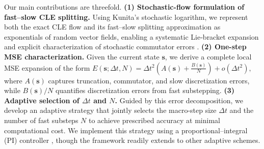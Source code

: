 \documentclass{article}
\begin{document}
Our main contributions are threefold.
\textbf{(1) Stochastic-flow formulation of fast--slow CLE splitting.}  
Using Kunita’s stochastic logarithm, we represent both the exact CLE flow and
its fast--slow splitting approximation as exponentials of random vector fields, enabling a systematic Lie‑bracket expansion and explicit characterization of stochastic commutator errors \cite{kunita1990stochastic,Misawa2000}.
\textbf{(2) One-step MSE characterization.}  
Given the current state $\pmb{s}$, we derive a complete local MSE expansion of the form
\(
E(\pmb{s};\Delta t,N)
= \Delta t^{2}\!\left(A(\pmb{s})+\frac{B(\pmb{s})}{N}\right)
+ o(\Delta t^{2}),
\)
where \(A(\pmb{s})\) captures truncation, commutator, and slow discretization errors,
while \(B(\pmb{s})/N\) quantifies discretization errors from fast substepping.
\textbf{(3) Adaptive selection of \(\Delta t\) and \(N\).}  
Guided by this error decomposition, we develop an adaptive strategy that jointly
selects the macro-step size \(\Delta t\) and the number of fast substeps \(N\) to achieve prescribed accuracy at minimal computational cost. We implement this strategy using a proportional–integral (PI) controller \cite{aastrom2013computer,ilie2015adaptive},
though the framework readily extends to other adaptive schemes.
\end{document}
